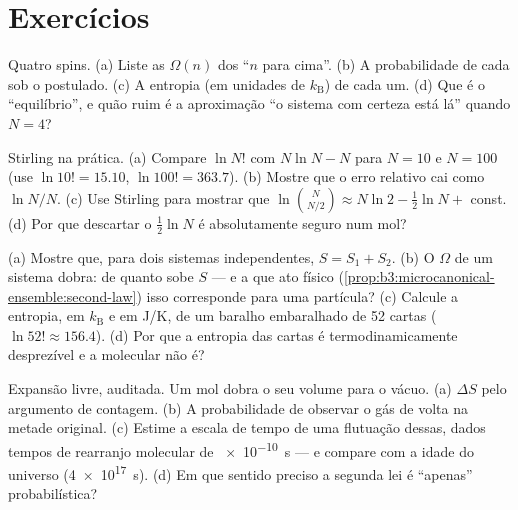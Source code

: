 \section{Exercícios}

\begin{exercise}[$\star$]\label{exo:b3:microcanonical-ensemble:1}
Quatro spins. (a) Liste as  $\Omega(n)$ dos
 ``$n$ para cima''. (b) A probabilidade de cada 
sob o postulado. (c) A entropia (em unidades de $k_{\text{B}}$) de cada
um. (d) Que  é o ``equilíbrio'', e quão ruim é a aproximação
``o sistema com certeza está lá'' quando $N = 4$?
\end{exercise}

\begin{exercise}[$\star$]\label{exo:b3:microcanonical-ensemble:2}
Stirling na prática. (a) Compare $\ln N!$ com $N\ln N - N$ para
$N = 10$ e $N = 100$ (use $\ln10! = 15.10$, $\ln100! = 363.7$).
(b) Mostre que o erro relativo cai como $\ln N/N$. (c) Use Stirling
para mostrar que $\ln\binom N{N/2} \approx N\ln2 - \tfrac12\ln N + $
const. (d) Por que descartar o $\tfrac12\ln N$ é absolutamente seguro
num mol?
\end{exercise}

\begin{exercise}[$\star$]\label{exo:b3:microcanonical-ensemble:3}
(a) Mostre que, para dois sistemas independentes, $S = S_1 + S_2$. (b)
O $\Omega$ de um sistema dobra: de quanto sobe $S$ --- e a que ato
físico (\cref{prop:b3:microcanonical-ensemble:second-law}) isso
corresponde para uma partícula? (c) Calcule a entropia, em
$k_{\text{B}}$ e em J/K, de um baralho embaralhado de 52 cartas
($\ln52! \approx 156.4$). (d) Por que a entropia das cartas é
termodinamicamente desprezível e a molecular não é?
\end{exercise}

\begin{exercise}[$\star$]\label{exo:b3:microcanonical-ensemble:4}
Expansão livre, auditada. Um mol dobra o seu volume para o vácuo.
(a) $\Delta S$ pelo argumento de contagem. (b) A probabilidade de
observar o gás de volta na metade original. (c) Estime a escala de
tempo de uma flutuação dessas, dados tempos de rearranjo molecular de
\qty{e-10}{s} --- e compare com a idade do universo
(\qty{4e17}{s}). (d) Em que sentido preciso a segunda lei é ``apenas''
probabilística?
\end{exercise}

